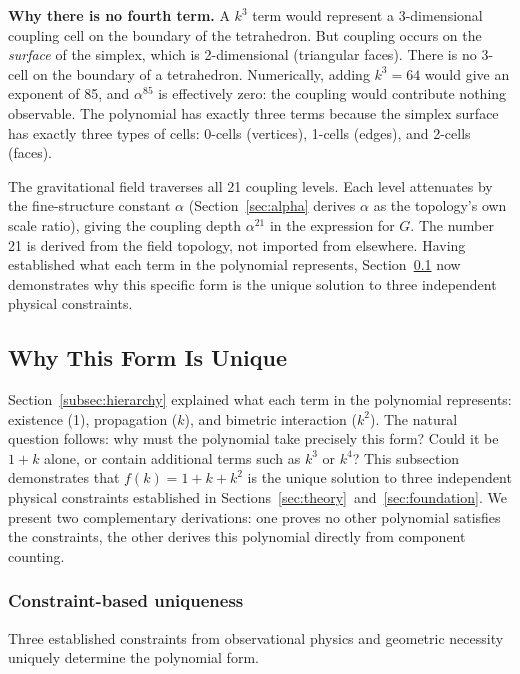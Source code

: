 \documentclass[aps,prd,preprint,superscriptaddress,showpacs,preprintnumbers,amsmath,amssymb,nofootinbib]{revtex4-2}
\begin{document}
\textbf{Why there is no fourth term.} A $k^3$ term would represent a 3-dimensional coupling cell on the boundary of the tetrahedron. But coupling occurs on the \emph{surface} of the simplex, which is 2-dimensional (triangular faces). There is no 3-cell on the boundary of a tetrahedron. Numerically, adding $k^3 = 64$ would give an exponent of 85, and $\alpha^{85}$ is effectively zero: the coupling would contribute nothing observable. The polynomial has exactly three terms because the simplex surface has exactly three types of cells: 0-cells (vertices), 1-cells (edges), and 2-cells (faces).

The gravitational field traverses all 21 coupling levels. Each level attenuates by the fine-structure constant $\alpha$ (Section~\ref{sec:alpha} derives $\alpha$ as the topology's own scale ratio), giving the coupling depth $\alpha^{21}$ in the expression for $G$. The number 21 is derived from the field topology, not imported from elsewhere. Having established what each term in the polynomial represents, Section~\ref{subsec:polynomial-uniqueness} now demonstrates why this specific form is the unique solution to three independent physical constraints.

\subsection{Why This Form Is Unique}
\label{subsec:polynomial-uniqueness}

Section~\ref{subsec:hierarchy} explained what each term in the polynomial represents: existence (1), propagation ($k$), and bimetric interaction ($k^2$). The natural question follows: why must the polynomial take precisely this form? Could it be $1 + k$ alone, or contain additional terms such as $k^3$ or $k^4$? This subsection demonstrates that $f(k) = 1 + k + k^2$ is the unique solution to three independent physical constraints established in Sections~\ref{sec:theory}~and~\ref{sec:foundation}. We present two complementary derivations: one proves no other polynomial satisfies the constraints, the other derives this polynomial directly from component counting.

\subsubsection*{Constraint-based uniqueness}

Three established constraints from observational physics and geometric necessity uniquely determine the polynomial form.
\end{document}
